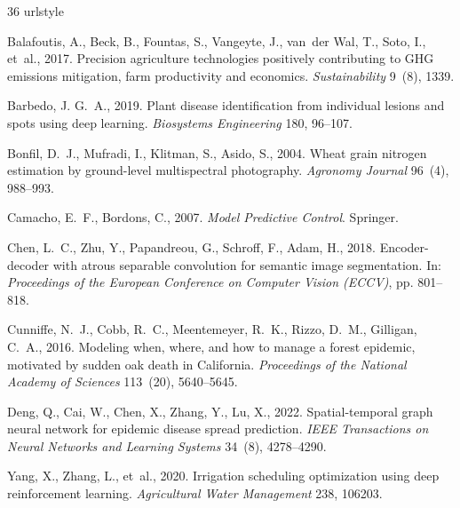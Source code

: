 \documentclass[review,3p,times,authoryear]{elsarticle}
\begin{document}

\begin{thebibliography}{36}
\providecommand{\natexlab}[1]{#1}
\providecommand{\url}[1]{\texttt{#1}}
\providecommand{\urlprefix}{URL }
\expandafter\ifx\csname urlstyle\endcsname\relax
  \providecommand{\doi}[1]{doi:\discretionary{}{}{}#1}\else
  \providecommand{\doi}{doi:\discretionary{}{}{}\begingroup
  \urlstyle{rm}\Url}\fi

Balafoutis, A., Beck, B., Fountas, S., Vangeyte, J., van~der Wal, T., Soto, I., et~al., 2017.
\newblock Precision agriculture technologies positively contributing to GHG emissions mitigation, farm productivity and economics.
\newblock \emph{Sustainability} 9~(8), 1339.

Barbedo, J. G.~A., 2019.
\newblock Plant disease identification from individual lesions and spots using deep learning.
\newblock \emph{Biosystems Engineering} 180, 96--107.

Bonfil, D.~J., Mufradi, I., Klitman, S., Asido, S., 2004.
\newblock Wheat grain nitrogen estimation by ground-level multispectral photography.
\newblock \emph{Agronomy Journal} 96~(4), 988--993.

Camacho, E.~F., Bordons, C., 2007.
\newblock \emph{Model Predictive Control}.
\newblock Springer.

Chen, L.~C., Zhu, Y., Papandreou, G., Schroff, F., Adam, H., 2018.
\newblock Encoder-decoder with atrous separable convolution for semantic image segmentation.
\newblock In: \emph{Proceedings of the European Conference on Computer Vision (ECCV)}, pp. 801--818.

Cunniffe, N.~J., Cobb, R.~C., Meentemeyer, R.~K., Rizzo, D.~M., Gilligan, C.~A., 2016.
\newblock Modeling when, where, and how to manage a forest epidemic, motivated by sudden oak death in California.
\newblock \emph{Proceedings of the National Academy of Sciences} 113~(20), 5640--5645.

Deng, Q., Cai, W., Chen, X., Zhang, Y., Lu, X., 2022.
\newblock Spatial-temporal graph neural network for epidemic disease spread prediction.
\newblock \emph{IEEE Transactions on Neural Networks and Learning Systems} 34~(8), 4278--4290.

Yang, X., Zhang, L., et~al., 2020.
\newblock Irrigation scheduling optimization using deep reinforcement learning.
\newblock \emph{Agricultural Water Management} 238, 106203.


\end{thebibliography}
\end{document}
